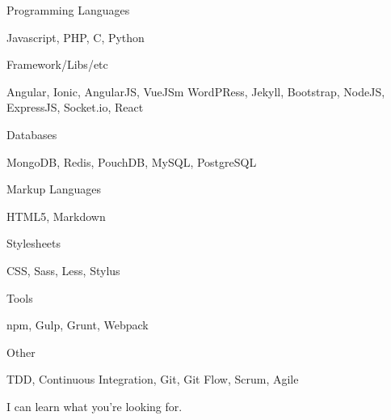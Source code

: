 

\begin{cventries}

  \cventry
    {Programming Languages} %
    {}
    {}
    {}
    {
      \begin{cvitems} %
        \item {Javascript, PHP, C, Python}
      \end{cvitems}
    }
    \cventry
    {Framework/Libs/etc} %
    {}
    {}
    {}
    {
      \begin{cvitems} %
        \item {Angular, Ionic, AngularJS, VueJSm WordPRess, Jekyll, Bootstrap, NodeJS, ExpressJS, Socket.io, React}
      \end{cvitems}
    }
    \cventry
    {Databases} %
    {}
    {}
    {}
    {
      \begin{cvitems} %
        \item {MongoDB, Redis, PouchDB, MySQL, PostgreSQL}
      \end{cvitems}
    }
    \cventry
    {Markup Languages} %
    {}
    {}
    {}
    {
      \begin{cvitems} %
        \item {HTML5, Markdown}
      \end{cvitems}
    }
    \cventry
    {Stylesheets} %
    {}
    {}
    {}
    {
      \begin{cvitems} %
        \item {CSS, Sass, Less, Stylus}
      \end{cvitems}
    }
    \cventry
    {Tools} %
    {}
    {}
    {}
    {
      \begin{cvitems} %
        \item {npm, Gulp, Grunt, Webpack}
      \end{cvitems}
    }
    \cventry
    {Other} %
    {}
    {}
    {}
    {
      \begin{cvitems} %
        \item {TDD, Continuous Integration, Git, Git Flow, Scrum, Agile}
        \item {I can learn what you're looking for.}
      \end{cvitems}
    }

\end{cventries}
